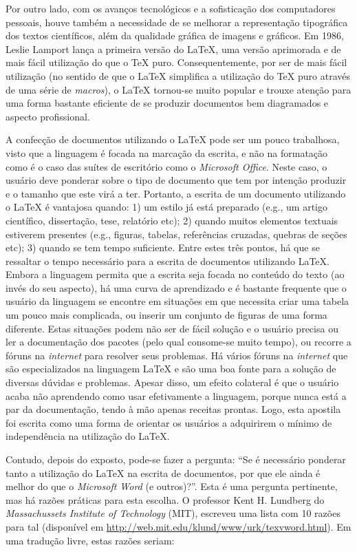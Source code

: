 Por outro lado, com os avanços tecnológicos e a sofisticação dos computadores pessoais, houve também a necessidade de se melhorar a representação tipográfica dos textos científicos, além da qualidade gráfica de imagens e gráficos. Em 1986, Leslie Lamport lança a primeira versão do \LaTeX{}, uma versão aprimorada e de mais fácil utilização do que o \TeX{} puro. Consequentemente, por ser de mais fácil utilização (no sentido de que o \LaTeX{} simplifica a utilização do \TeX{} puro através de uma série de \textit{macros}), o \LaTeX{} tornou-se muito popular e trouxe atenção para uma forma bastante eficiente de se produzir documentos bem diagramados e aspecto profissional.

A confecção de documentos utilizando o \LaTeX{} pode ser um pouco trabalhosa, visto que a linguagem é focada na marcação da escrita, e não na formatação como é o caso das suítes de escritório como o \textit{Microsoft Office}. Neste caso, o usuário deve ponderar sobre o tipo de documento que tem por intenção produzir e o tamanho que este virá a ter. Portanto, a escrita de um documento utilizando o \LaTeX{} é vantajosa quando: 1) um estilo já está preparado (e.g., um artigo científico, dissertação, tese, relatório etc); 2) quando muitos elementos textuais estiverem presentes (e.g., figuras, tabelas, referências cruzadas, quebras de seções etc); 3) quando se tem tempo suficiente. Entre estes três pontos, há que se ressaltar o tempo necessário para a escrita de documentos utilizando \LaTeX{}. Embora a linguagem permita que a escrita seja focada no conteúdo do texto (ao invés do seu aspecto), há uma curva de aprendizado e é bastante frequente que o usuário da linguagem se encontre em situações em que necessita criar uma tabela um pouco mais complicada, ou inserir um conjunto de figuras de uma forma diferente. Estas situações podem não ser de fácil solução e o usuário precisa ou ler a documentação dos pacotes (pelo qual consome-se muito tempo), ou recorre a fóruns na \textit{internet} para resolver seus problemas. Há vários fóruns na \textit{internet} que são especializados na linguagem \LaTeX{} e são uma boa fonte para a solução de diversas dúvidas e problemas. Apesar disso, um efeito colateral é que o usuário acaba não aprendendo como usar efetivamente a linguagem, porque nunca está a par da documentação, tendo à mão apenas receitas prontas. Logo, esta apostila foi escrita como uma forma de orientar os usuários a adquirirem o mínimo de independência na utilização do \LaTeX{}.

Contudo, depois do exposto, pode-se fazer a pergunta: ``Se é necessário ponderar tanto a utilização do \LaTeX{} na escrita de documentos, por que ele ainda é melhor do que o \textit{Microsoft Word} (e outros)?''. Esta é uma pergunta pertinente, mas há razões práticas para esta escolha. O professor Kent H. Lundberg do \textit{Massachussets Institute of Technology} (MIT), escreveu uma lista com 10 razões para tal (disponível em \url{http://web.mit.edu/klund/www/urk/texvword.html}). Em uma tradução livre, estas razões seriam:

